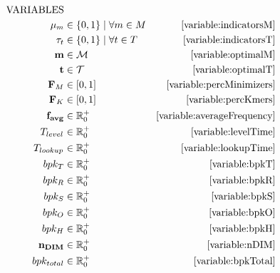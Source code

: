 \documentclass[a4paper,titlepage,onecolumn,oneside,12pt,nenglish,titlepage=firstiscover]{scrbook}
\theoremstyle{plain} %
\theoremstyle{definition} %
\theoremstyle{remark} %
\theoremstyle{plain}
\newcommand{\RR}{\mathbb{R}} %
\newcommand{\minimizerLength}{m}
\newcommand{\threshold}{t}
\newcommand{\timeForOperationOnStructure}[2]{T_{#1_{#2}}} %
\newcommand{\varAverageFrequency}{\textbf{f}_{\textbf{avg}}}
\newcommand{\possibleMinimizerLengths}{\mathcal{M}}
\newcommand{\possibleThresholds}{\mathcal{T}}
\newcommand{\indicatorm}{\mu}
\newcommand{\indicatort}{\tau}
\newcommand{\varMinimizerLength}{\textbf{\minimizerLength}}
\newcommand{\varThreshold}{\textbf{\threshold}}
\begin{document}
\begin{align*}
	\text{VARIABLES}\\
	\indicatorm_\minimizerLength &\in \{0,1\} \mid \forall m \in M &\cref{variable:indicatorsM}\\
	\indicatort_\threshold &\in \{0,1\} \mid \forall t \in T &\cref{variable:indicatorsT}\\
	\varMinimizerLength &\in \possibleMinimizerLengths &\cref{variable:optimalM}\\
	\varThreshold &\in \possibleThresholds &\cref{variable:optimalT}\\
	\varCDF{M} &\in [0,1] &\cref{variable:percMinimizers}\\
	\varCDF{K} &\in [0,1] &\cref{variable:percKmers}\\
	\varAverageFrequency &\in \RR_0^+ &\cref{variable:averageFrequency}\\
	\timeForOperationOnStructure{level}{} &\in \RR^+_0 &\cref{variable:levelTime}\\
	\timeForOperationOnStructure{lookup}{} &\in \RR_0^+ &\cref{variable:lookupTime}\\
	bpk_T &\in \RR_0^+ &\cref{variable:bpkT}\\
	bpk_R &\in \RR_0^+ &\cref{variable:bpkR}\\
	bpk_S &\in \RR_0^+ &\cref{variable:bpkS}\\
	bpk_O &\in \RR_0^+ &\cref{variable:bpkO}\\
	bpk_H &\in \RR_0^+ &\cref{variable:bpkH}\\
	\varNumberOfDistinctMinimizers &\in \RR^+_0 &\cref{variable:nDIM}\\
	bpk_{total} &\in \RR_0^+ &\cref{variable:bpkTotal}
\end{align*} 
\end{document}
